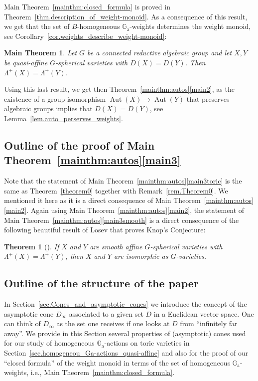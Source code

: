 \documentclass[11pt]{article}
\newcommand{\ie}{i.e.,\xspace}
\numberwithin{equation}{section}
\newcommand{\ra}{\mathrm{a}}
\theoremstyle{plain}
\newtheorem{maintheorem}{Main Theorem}
\newtheorem{introtheorem}{Theorem}
\theoremstyle{definition}
\DeclareMathOperator{\Aut}{Aut}
\newcommand{\GG}{\mathbb{G}}
\newcommand{\name}[1]{#1}
\begin{document}
Main Theorem~\ref{mainthm:closed_formula} is proved in Theorem~\ref{thm.description_of_weight-monoid}.
As a consequence of this result, we get that the set of $B$-homogeneous $\GG_\ra$-weights
determines the weight monoid, see Corollary~\ref{cor.weights_describe_weight-monoid}:

\begin{maintheorem}
\label{main_weight_monoid}
Let $G$ be a connected reductive algebraic group and let
$X, Y$ be quasi-affine $G$-spherical varieties with $D(X) = D(Y)$. Then $\Lambda^+(X) = \Lambda^+(Y)$.
\end{maintheorem}

Using this last result, we get then Theorem~\ref{mainthm:autos}\eqref{main2},
as the existence of a group isomorphism $\Aut(X) \to \Aut(Y)$ that preserves algebraic groups
implies that $D(X) = D(Y)$, see Lemma~\ref{lem.auto_perserves_weights}.

\subsection*{Outline of the proof of Main Theorem~\ref{mainthm:autos}\eqref{main3}}
Note that the statement of Main Theorem~\ref{mainthm:autos}\eqref{main3toric} is
the same as Theorem~\ref{theorem0}
together with Remark~\ref{rem.Theorem0}. We mentioned it here as it is a
direct consequence of Main Theorem~\ref{mainthm:autos}\eqref{main2}.
Again using Main Theorem~\ref{mainthm:autos}\eqref{main2},
the statement of Main Theorem~\ref{mainthm:autos}\eqref{main3smooth} is a direct
consequence of the following beautiful result of \name{Losev}
that proves \name{Knop}'s Conjecture:

\begin{introtheorem}[{\cite[Th.\,1.3]{Lo2009Proof-of-the-Knop-}}]
\label{thm.losev}
If $X$ and $Y$ are smooth affine $G$-spherical varieties with $\Lambda^+(X) = \Lambda^+(Y)$,
then $X$ and $Y$ are isomorphic as $G$-varieties.
\end{introtheorem}

\subsection*{Outline of the structure of the paper }
In Section~\ref{sec.Cones_and_asymptotic_cones} we introduce the concept of the
asymptotic cone $D_{\infty}$ associated to a given set $D$ in a Euclidean vector space.
One can think of $D_{\infty}$ as the set one receives if one looks at $D$ from
``infinitely far away''. We provide in this Section several properties of (asymptotic) cones used
for our study of homogeneous $\GG_\ra$-actions on toric varieties in Section~\ref{sec.homogeneou_Ga-actions_quasi-affine} and also for the proof of
our ``closed formula'' of the weight monoid in terms of the set of homogeneous $\GG_\ra$-weights,
\ie Main Theorem~\ref{mainthm:closed_formula}.
\end{document}
